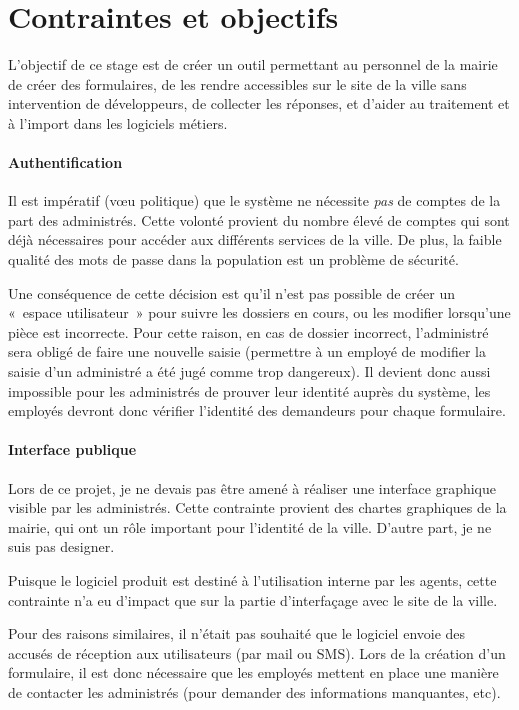\section{Contraintes et objectifs}\label{sec:contraintes-et-objectifs}

L'objectif de ce stage est de créer un outil permettant au personnel de la mairie de créer des formulaires, de les rendre accessibles sur le site de la ville sans intervention de développeurs, de collecter les réponses, et d'aider au traitement et à l'import dans les logiciels métiers.

\paragraph{Authentification}
Il est impératif (vœu politique) que le système ne nécessite \emph{pas} de comptes de la part des administrés.
Cette volonté provient du nombre élevé de comptes qui sont déjà nécessaires pour accéder aux différents services de la ville.
De plus, la faible qualité des mots de passe dans la population est un problème de sécurité.

Une conséquence de cette décision est qu'il n'est pas possible de créer un «~espace utilisateur~» pour suivre les dossiers en cours, ou les modifier lorsqu'une pièce est incorrecte.
Pour cette raison, en cas de dossier incorrect, l'administré sera obligé de faire une nouvelle saisie (permettre à un employé de modifier la saisie d'un administré a été jugé comme trop dangereux).
Il devient donc aussi impossible pour les administrés de prouver leur identité auprès du système, les employés devront donc vérifier l'identité des demandeurs pour chaque formulaire.

\paragraph{Interface publique}
Lors de ce projet, je ne devais pas être amené à réaliser une interface graphique visible par les administrés.
Cette contrainte provient des chartes graphiques de la mairie, qui ont un rôle important pour l'identité de la ville.
D'autre part, je ne suis pas designer.

Puisque le logiciel produit est destiné à l'utilisation interne par les agents, cette contrainte n'a eu d'impact que sur la partie d'interfaçage avec le site de la ville.

Pour des raisons similaires, il n'était pas souhaité que le logiciel envoie des accusés de réception aux utilisateurs (par mail ou SMS).
Lors de la création d'un formulaire, il est donc nécessaire que les employés mettent en place une manière de contacter les administrés (pour demander des informations manquantes, etc).

